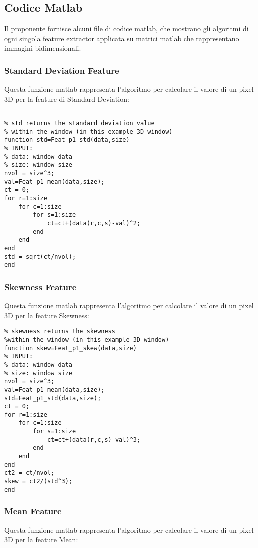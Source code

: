 \subsection{Codice Matlab}
\label{codicematlab}

Il proponente fornisce alcuni file di codice matlab, che mostrano gli algoritmi di ogni singola feature extractor\g{} applicata su matrici matlab che rappresentano immagini bidimensionali.

\subsubsection{Standard Deviation Feature}
\label{stdcode}
Questa funzione matlab rappresenta l'algoritmo per calcolare il valore di un pixel 3D per la feature di Standard Deviation:

\begin{lstlisting}

% std returns the standard deviation value
% within the window (in this example 3D window)
function std=Feat_p1_std(data,size)
% INPUT: 
% data: window data
% size: window size
nvol = size^3;
val=Feat_p1_mean(data,size);
ct = 0;
for r=1:size
	for c=1:size
		for s=1:size
			ct=ct+(data(r,c,s)-val)^2;
		end
	end
end
std = sqrt(ct/nvol);
end
\end{lstlisting} 

\subsubsection{Skewness Feature}
\label{skewnesscode}
Questa funzione matlab rappresenta l'algoritmo per calcolare il valore di un pixel 3D per la feature Skewness:

\begin{lstlisting}
% skewness returns the skewness 
%within the window (in this example 3D window)
function skew=Feat_p1_skew(data,size)
% INPUT: 
% data: window data
% size: window size
nvol = size^3;
val=Feat_p1_mean(data,size);
std=Feat_p1_std(data,size);
ct = 0;
for r=1:size
	for c=1:size
		for s=1:size
			ct=ct+(data(r,c,s)-val)^3;
		end
	end
end
ct2 = ct/nvol;
skew = ct2/(std^3);
end
\end{lstlisting}

\subsubsection{Mean Feature}
\label{meancode}
Questa funzione matlab rappresenta l'algoritmo per calcolare il valore di un pixel 3D per la feature Mean:

